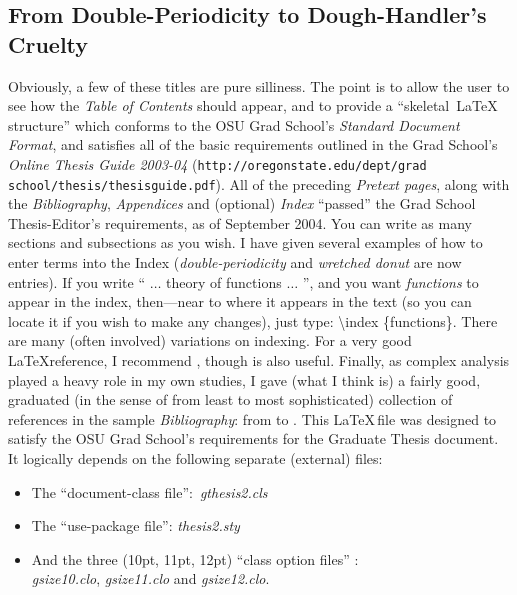 \documentclass[11pt]{gthesis2}  %
\begin{document}
\subsection{From Double-Periodicity to Dough-Handler's Cruelty}
\label{sub:double}
%
 
%
\indent Obviously, a few of these titles are pure silliness. The
point is to allow the user to see how the \emph{Table of Contents}
should appear, and to provide a ``skeletal\, \LaTeX\; structure''
which conforms to the OSU Grad School's \emph{Standard Document
Format}, and satisfies all of the basic requirements outlined in
the Grad School's \emph{Online Thesis Guide 2003-04}
(\texttt{http://oregonstate.edu/dept/grad
school/thesis/thesisguide.pdf}). All of the preceding
\emph{Pretext pages}, along with the \emph{Bibliography},
\emph{Appendices} and (optional) \emph{Index} ``passed'' the Grad
School Thesis-Editor's requirements, as of September 2004. You can
write as many sections and subsections as you wish. I have given
several examples of how to enter terms into the Index
(\emph{double-periodicity} and \emph{wretched donut} are now
entries). If you write `` $\dots$ theory of functions $\dots$ '',
and you want \emph{functions} to appear in the index, then---near
to where it appears in the text (so you can locate it if you wish
to make any changes), just type: \textbackslash index
\{functions\}.
%
%
%
%
There are many (often involved) variations on indexing. For a very
good \,\LaTeX\;reference, I recommend \cite{gG00}, though
\cite{KD99} is also useful. Finally, as complex analysis played a
heavy role in my own studies, I gave (what I think is) a fairly
good, graduated (in the sense of from least to most sophisticated)
collection of references in the sample \emph{Bibliography}: from
\cite{BC04} to \cite{iL93}.
%
\newpage
%
This \LaTeX \,file was designed to satisfy the OSU Grad School's
requirements for the Graduate Thesis document. It logically
depends on the following separate (external) files:
%
\begin{itemize}
     \item The ``document-class file'':  \quad\,\emph{gthesis2.cls}
     \item The ``use-package file'': \qquad \; \emph{thesis2.sty}
     \item And the three (10pt, 11pt, 12pt) ``class option files'' :
     \\ \emph{gsize10.clo}\;, \quad \emph{gsize11.clo} \quad and \quad
     \emph{gsize12.clo}\;.
\end{itemize}
\end{document}
